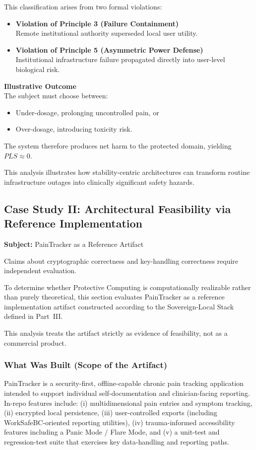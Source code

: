 \documentclass[12pt]{article}
\begin{document}
This classification arises from two formal violations:
\begin{itemize}
\item \textbf{Violation of Principle 3 (Failure Containment)}\\
  Remote institutional authority superseded local user utility.
\item \textbf{Violation of Principle 5 (Asymmetric Power Defense)}\\
  Institutional infrastructure failure propagated directly into user-level biological risk.
\end{itemize}

\textbf{Illustrative Outcome}\\
The subject must choose between:
\begin{itemize}
\item Under-dosage, prolonging uncontrolled pain, or
\item Over-dosage, introducing toxicity risk.
\end{itemize}
The system therefore produces net harm to the protected domain, yielding $PLS \approx 0$.

This analysis illustrates how stability-centric architectures can transform routine infrastructure outages into clinically significant safety hazards.

\subsection{Case Study II: Architectural Feasibility via Reference Implementation}
\label{sec:case-study-ii}
\textbf{Subject:} PainTracker as a Reference Artifact

Claims about cryptographic correctness and key-handling correctness require independent evaluation.

To determine whether Protective Computing is computationally realizable rather than purely theoretical, this section evaluates PainTracker as a reference implementation artifact constructed according to the Sovereign-Local Stack defined in Part~III.

This analysis treats the artifact strictly as evidence of feasibility, not as a commercial product.

\subsubsection{What Was Built (Scope of the Artifact)}
PainTracker is a security-first, offline-capable chronic pain tracking application intended to support individual self-documentation and clinician-facing reporting. In-repo features include: (i) multidimensional pain entries and symptom tracking, (ii) encrypted local persistence, (iii) user-controlled exports (including WorkSafeBC-oriented reporting utilities), (iv) trauma-informed accessibility features including a Panic Mode / Flare Mode, and (v) a unit-test and regression-test suite that exercises key data-handling and reporting paths.
\end{document}
